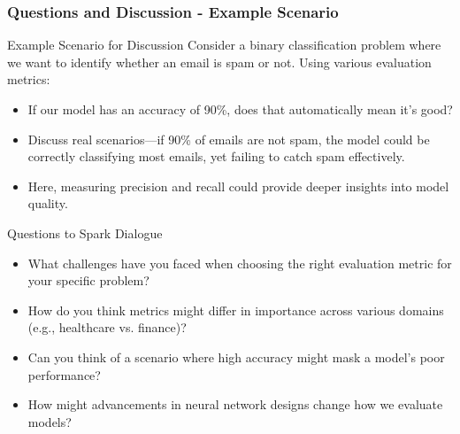 \documentclass[aspectratio=169]{beamer}
\begin{document}
\begin{frame}[fragile]
    \frametitle{Questions and Discussion - Example Scenario}
    \begin{block}{Example Scenario for Discussion}
        Consider a binary classification problem where we want to identify whether an email is spam or not. 
        Using various evaluation metrics:
        \begin{itemize}
            \item If our model has an accuracy of 90\%, does that automatically mean it’s good? 
            \item Discuss real scenarios—if 90\% of emails are not spam, the model could be correctly classifying most emails, yet failing to catch spam effectively.
            \item Here, measuring precision and recall could provide deeper insights into model quality.
        \end{itemize}
    \end{block}

    \begin{block}{Questions to Spark Dialogue}
        \begin{itemize}
            \item What challenges have you faced when choosing the right evaluation metric for your specific problem?
            \item How do you think metrics might differ in importance across various domains (e.g., healthcare vs. finance)?
            \item Can you think of a scenario where high accuracy might mask a model's poor performance? 
            \item How might advancements in neural network designs change how we evaluate models?
        \end{itemize}
    \end{block}
\end{frame}
\end{document}
